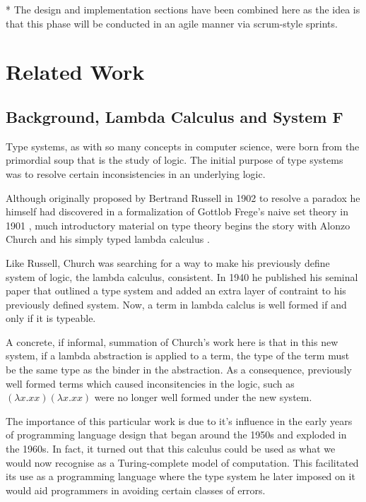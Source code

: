 \documentclass{ProgressReport}[2020/09/15]
\begin{document}
        * The design and implementation sections have been combined
        here as the idea is that this phase will be conducted in an
        agile manner via scrum-style sprints.
        
        \chapter{Related Work}

        \section{Background, Lambda Calculus and System F}

          Type systems, as with so many concepts in computer science,
          were born from the primordial soup that is the study of
          logic. The initial purpose of type systems was to resolve
          certain inconsistencies in an underlying logic. 
      
          Although originally proposed by Bertrand Russell in 1902 to
          resolve a paradox he himself had discovered in a formalization of
          Gottlob Frege's naive set theory in 1901 \cite{Russell1901}, much
          introductory material on type theory begins the story with
          Alonzo Church and his simply typed lambda calculus
          \cite{church1940}.
      
          Like Russell, Church was searching for a way to make his
          previously define system of logic, the lambda calculus,
          consistent. In 1940 he published his seminal paper that outlined a
          type system and added an extra layer of contraint to his
          previously defined system. Now, a term in lambda calclus is well
          formed if and only if it is typeable.
      
          A concrete, if informal, summation of Church's work here is that
          in this new system, if a lambda abstraction is applied to a term,
          the type of the term must be the same type as the binder in the
          abstraction. As a consequence, previously well formed terms which
          caused inconsitencies in the logic, such as
          $ (\lambda x.xx)(\lambda x.xx)  $
          were no longer well formed under the new system.
      
          The importance of this particular work is due to it's influence in
          the early years of programming language design that began around
          the 1950s and exploded in the 1960s. In fact, it turned out
          that this calculus could be used as what we would now
          recognise as a Turing-complete model of computation. This
          facilitated its use as a programming language where the type
          system he later imposed on it would aid programmers in
          avoiding certain classes of errors. 
      
\end{document}
